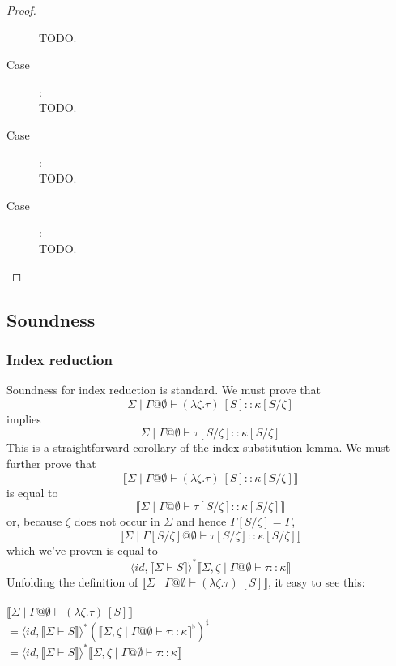 \documentclass{article}
\newcommand{\sem}[1]{\llbracket #1 \rrbracket}
\begin{document}
\begin{proof}
\begin{description}
TODO.

\item[Case \sc{TyAbs}]:~\\

TODO.

\item[Case \sc{TyApp}]:~\\

TODO.

\item[Case \sc{StrApp}]:~\\

TODO.

\end{description}

\end{proof}

\subsection*{Soundness}

\subsubsection*{Index reduction}

Soundness for index reduction is standard. We must prove that $$\Sigma \mid \Gamma @ \emptyset \vdash (\lambda \zeta.\tau)~[S] :: \kappa[S/\zeta]$$ implies $$\Sigma \mid \Gamma @ \emptyset \vdash \tau[S/\zeta] :: \kappa[S/\zeta]$$ This is a straightforward corollary of the index substitution lemma.
We must further prove that $$\sem{\Sigma \mid \Gamma @ \emptyset \vdash (\lambda \zeta.\tau)~[S] :: \kappa[S/\zeta]}$$
is equal to $$\sem{\Sigma \mid \Gamma @ \emptyset \vdash \tau[S/\zeta] :: \kappa[S/\zeta]}$$ or, because $\zeta$ does not occur in $\Sigma$ and hence $\Gamma[S/\zeta] = \Gamma$, $$\sem{\Sigma \mid \Gamma[S/\zeta] @ \emptyset \vdash \tau[S/\zeta] :: \kappa[S/\zeta]}$$ which we've proven is equal to $$\langle \mathit{id}, \sem{\Sigma \vdash S} \rangle^* \sem{\Sigma,\zeta \mid \Gamma @ \emptyset \vdash \tau :: \kappa}$$
Unfolding the definition of $\sem{\Sigma \mid \Gamma @ \emptyset \vdash (\lambda \zeta. \tau)~[S]}$, it easy to see this:\\~\\
$\sem{\Sigma \mid \Gamma @ \emptyset \vdash (\lambda \zeta. \tau)~[S]}$\\
$= \langle \mathit{id}, \sem{\Sigma \vdash S} \rangle^* (\sem{\Sigma,\zeta \mid \Gamma @ \emptyset \vdash \tau :: \kappa}^\flat)^\sharp$\\
$= \langle \mathit{id}, \sem{\Sigma \vdash S} \rangle^* \sem{\Sigma,\zeta \mid \Gamma @ \emptyset \vdash \tau :: \kappa}$ 
\end{document}
